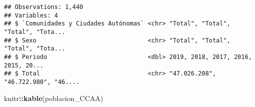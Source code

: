 \documentclass[
]{article}
\newenvironment{Shaded}{\begin{snugshade}}{\end{snugshade}}
\newcommand{\KeywordTok}[1]{\textcolor[rgb]{0.13,0.29,0.53}{\textbf{#1}}}
\newcommand{\NormalTok}[1]{#1}
\newcommand{\OperatorTok}[1]{\textcolor[rgb]{0.81,0.36,0.00}{\textbf{#1}}}
\begin{document}
\begin{verbatim}
## Observations: 1,440
## Variables: 4
## $ `Comunidades y Ciudades Autónomas` <chr> "Total", "Total", "Total", "Tota...
## $ Sexo                               <chr> "Total", "Total", "Total", "Tota...
## $ Periodo                            <dbl> 2019, 2018, 2017, 2016, 2015, 20...
## $ Total                              <chr> "47.026.208", "46.722.980", "46....
\end{verbatim}

\begin{Shaded}
\begin{Highlighting}[]
\NormalTok{knitr}\OperatorTok{::}\KeywordTok{kable}\NormalTok{(poblacion_CCAA)}
\end{Highlighting}
\end{Shaded}
\end{document}
